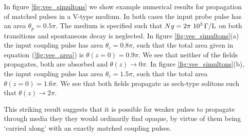     In figure \ref{fig:vee_simultons} we show example numerical results for
    propagation of matched pulses in a V-type medium. In both cases the input
    probe pulse has an area $\theta_p = 0.5 \pi$. The medium is specified such
    that $Ng = \unit[2\pi~10^3]{\Gamma/L}$ on both transitions and spontaneous
    decay is neglected. In figure \ref{fig:vee_simultons}(a) the input coupling
    pulse has area $\theta_c = 0.8 \pi$, such that the total area given in
    equation (\ref{fig:vee_area}) is $\theta(z{=}0) = 0.9 \pi$. We see that
    neither of the fields propagates, both are absorbed and $\theta(z)
    \rightarrow 0 \pi$. In figure \ref{fig:vee_simultons}(b), the input
    coupling pulse has area $\theta_c = 1.5 \pi$, such that the total area
    $\theta(z{=}0) = 1.6 \pi$. We see that both fields propagate as sech-type
    solitons such that $\theta(z) \rightarrow 2 \pi$.

    This striking result suggests that it is possible for weaker pulses to
    propagate through media they they would ordinarily find opaque, by virtue of
    them being `carried along' with an exactly matched coupling pulses.

